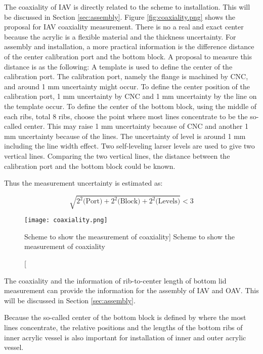 The coaxiality of IAV is directly related to the scheme to installation.
This will be discussed in Section \ref{sec:assembly}.
Figure \ref{fig:coaxiality.png} shows the proposal for IAV coaxiality measurement.
There is no a real and exact center because the acrylic is a flexible material and
the thickness uncertainty. For assembly and installation, a more practical information is the difference
distance of the center calibration port and the bottom block.
A proposal to measure this distance is as the following:
A template is used to define the center of the calibration port.
The calibration port, namely the flange is machined by CNC, and around 1 mm uncertainty might occur.
To define the center position of the calibration port,
1 mm uncertainty by CNC and 1 mm uncertainty by the line on the template occur.
To define the center of the bottom block, using the middle of each ribs, total 8 ribs, choose
the point where most lines concentrate to be the so-called center.
This may raise 1 mm uncertainty because of CNC and
another 1 mm uncertainty because of the lines.
The uncertainty of level is around 1 mm including the line width effect.
Two self-leveling larser levels are used to give two vertical lines.
Comparing the two vertical lines, the distance between the calibration port and the bottom
block could be known.

Thus the measurement uncertainty is estimated as:


\begin{equation}
\label{equ:coaxiality}
\sqrt{
2^2\mbox{(Port)} +
2^2\mbox{(Block)} +
2^2\mbox{(Levels)}
} < 3
\end{equation}


\begin{figure}
    \centering
    \texttt{[image: coaxiality.png]}
    \caption
    [Scheme to show the measurement of coaxiality]
    {Scheme to show the measurement of coaxiality}
    \label{fig:coaxiality}
    \end{figure}


The coaxiality and the information of rib-to-center length of bottom lid measurement can
provide the information for the assembly of IAV and OAV. This will be discussed in Section \ref{sec:assembly}.

Because the so-called center of the bottom block is defined by where the most lines concentrate,
the relative positions and the lengths of the bottom ribs of inner acrylic vessel is also important for installation of
inner and outer acrylic vessel.

